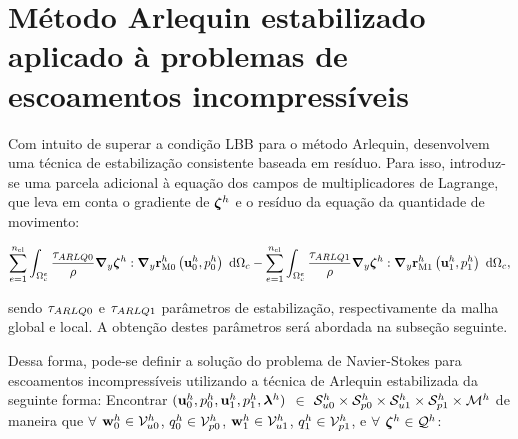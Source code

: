 \section{Método Arlequin estabilizado aplicado à problemas de escoamentos incompressíveis}

Com intuito de superar a condição LBB para o método Arlequin,  desenvolvem uma técnica de estabilização consistente baseada em resíduo. Para isso, introduz-se uma parcela adicional à equação dos campos de multiplicadores de Lagrange, que leva em conta o gradiente de $\boldsymbol{\zeta}^h$ e o resíduo da equação da quantidade de movimento:

\begin{align}
	\sum_{e=1}^{n_{\mathrm{el}}} \int_{\Omega^e_{c}} \frac{\tau_{ARLQ0}}{\rho} \boldsymbol{\nabla}_y \boldsymbol{\zeta}^h : \boldsymbol{\nabla}_y \mathbf{r}_{\mathrm{M0}}^{h}\left(\mathbf{u}_0^h,p_0^h \right) \ \mathrm{d} \Omega_c - 
	\sum_{e=1}^{n_{\mathrm{el}}} \int_{\Omega^e_{c}} \frac{\tau_{ARLQ1}}{\rho} \boldsymbol{\nabla}_y \boldsymbol{\zeta}^h : \boldsymbol{\nabla}_y \mathbf{r}_{\mathrm{M1}}^{h}\left(\mathbf{u}_1^h,p_1^h \right) \ \mathrm{d} \Omega_c,
\end{align}

\noindent sendo $\tau_{ARLQ0}$ e $\tau_{ARLQ1}$ parâmetros de estabilização, respectivamente da malha global e local. A obtenção destes parâmetros será abordada na subseção seguinte. 

Dessa forma, pode-se definir a solução do problema de Navier-Stokes para escoamentos incompressíveis utilizando a técnica de Arlequin estabilizada da seguinte forma: Encontrar $(\mathbf{u}_0^h,p_0^h,\mathbf{u}_1^h,p_1^h,\boldsymbol{\lambda}^h)$ $\in$ $\mathcal{S}_{u0}^h \times \mathcal{S}_{p0}^h \times \mathcal{S}_{u1}^h \times \mathcal{S}_{p1}^h \times \mathcal{M}^h$ de maneira que  $\forall$ $\mathbf{w}_0^h \in \mathcal{V}_{u0}^h$, $q_0^h \in \mathcal{V}_{p0}^h$, $\mathbf{w}_1^h \in \mathcal{V}_{u1}^h$, $q_1^h \in \mathcal{V}_{p1}^h$,   e $\forall$ $\boldsymbol{\zeta}^h \in \mathcal{Q}^h$:

